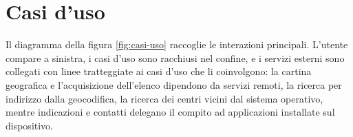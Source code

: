 
\section{Casi d'uso}\label{sec:casi-duso}

Il diagramma della figura \ref{fig:casi-uso} raccoglie le interazioni principali.
L'utente compare a sinistra, i casi d'uso sono racchiusi nel confine, e i servizi esterni sono collegati con
linee tratteggiate ai casi d'uso che li coinvolgono: la cartina geografica e l'acquisizione dell'elenco dipendono da
servizi remoti, la ricerca per indirizzo dalla geocodifica, la ricerca dei centri vicini dal sistema operativo, mentre
indicazioni e contatti delegano il compito ad applicazioni installate sul dispositivo.

